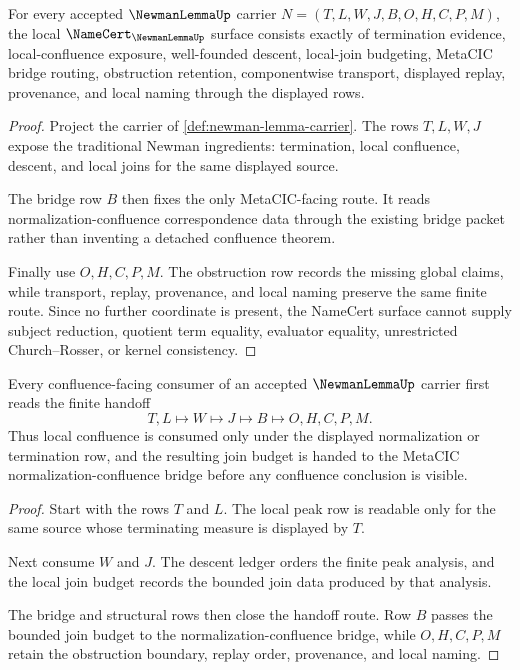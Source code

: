 \begin{theorem}
\label{thm:newman-lemma-namecert-obligations}
For every accepted $\NewmanLemmaUp$ carrier $N=(T,L,W,J,B,O,H,C,P,M)$, the local $\NameCert_{\NewmanLemmaUp}$ surface consists exactly of termination evidence, local-confluence exposure, well-founded descent, local-join budgeting, MetaCIC bridge routing, obstruction retention, componentwise transport, displayed replay, provenance, and local naming through the displayed rows.
\end{theorem}
\begin{proof}
Project the carrier of \autoref{def:newman-lemma-carrier}. The rows $T,L,W,J$ expose the traditional Newman ingredients: termination, local confluence, descent, and local joins for the same displayed source.

The bridge row $B$ then fixes the only MetaCIC-facing route. It reads normalization-confluence correspondence data through the existing bridge packet rather than inventing a detached confluence theorem.

Finally use $O,H,C,P,M$. The obstruction row records the missing global claims, while transport, replay, provenance, and local naming preserve the same finite route. Since no further coordinate is present, the NameCert surface cannot supply subject reduction, quotient term equality, evaluator equality, unrestricted Church--Rosser, or kernel consistency.
\end{proof}

\begin{theorem}
\label{thm:newman-lemma-local-confluence-normalization-handoff}
Every confluence-facing consumer of an accepted $\NewmanLemmaUp$ carrier first reads the finite handoff
$$
T,L \longmapsto W \longmapsto J \longmapsto B \longmapsto O,H,C,P,M .
$$
Thus local confluence is consumed only under the displayed normalization or termination row, and the resulting join budget is handed to the MetaCIC normalization-confluence bridge before any confluence conclusion is visible.
\end{theorem}
\begin{proof}
Start with the rows $T$ and $L$. The local peak row is readable only for the same source whose terminating measure is displayed by $T$.

Next consume $W$ and $J$. The descent ledger orders the finite peak analysis, and the local join budget records the bounded join data produced by that analysis.

The bridge and structural rows then close the handoff route. Row $B$ passes the bounded join budget to the normalization-confluence bridge, while $O,H,C,P,M$ retain the obstruction boundary, replay order, provenance, and local naming.
\end{proof}

